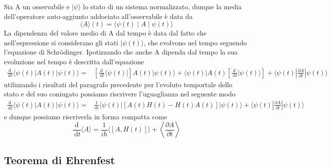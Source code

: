 Sia A un osservabile e $|\psi\rangle$ lo stato di un sistema normalizzato, dunque la media dell'operatore auto-aggiunto addociato all'osservabile \`e data da 
\begin{equation*}
	\langle A \rangle (t)  = \langle \psi(t) \mid A \mid \psi(t) \rangle
\end{equation*}
La dipendenza del valore medio di A dal tempo \`e data dal fatto che nell'espressione si considerano gli stati $|\psi(t)\rangle$, che evolvono nel tempo seguendo l'equazione di Schr\"odinger. Ipotizzando che anche A dipenda dal tempo la sua evoluzione nel tempo \`e descritta dall'equazione
\begin{equation*}
	\begin{aligned}
\frac{\mathrm{d}}{\mathrm{~d} t}\langle\psi(t)| A(t)|\psi(t)\rangle= & {\left[\frac{\mathrm{d}}{\mathrm{~d} t}\langle\psi(t)|\right] A(t)|\psi(t)\rangle+\langle\psi(t)| A(t)\left[\frac{\mathrm{d}}{\mathrm{~d} t}|\psi(t)\rangle\right] } 
 +\langle\psi(t)| \frac{\partial A}{\partial t}|\psi(t)\rangle
\end{aligned}
\end{equation*}
utilizzando i risultati del paragrafo precedente per l'evoluto temportale dello stato e del suo coniugato possiamo riscrivere l'uguaglianza nel seguente modo
\begin{equation*}
	\begin{aligned}
\frac{\mathrm{d}}{\mathrm{~d} t}\langle\psi(t)| A(t)|\psi(t)\rangle= & \frac{1}{i \hbar}\langle\psi(t)|[A(t) H(t)-H(t) A(t)]|\psi(t)\rangle 
 +\langle\psi(t)| \frac{\partial A}{\partial t}|\psi(t)\rangle
\end{aligned}
\end{equation*}
e dunque possiamo riscriverla in forma compatta come 
\begin{equation}
	\frac{\mathrm{d}}{\mathrm{~d} t}\langle A\rangle=\frac{1}{i \hbar}\langle[A, H(t)]\rangle+\left\langle\frac{\partial A}{\partial t}\right\rangle
\end{equation}

\subsection{Teorema di Ehrenfest}

